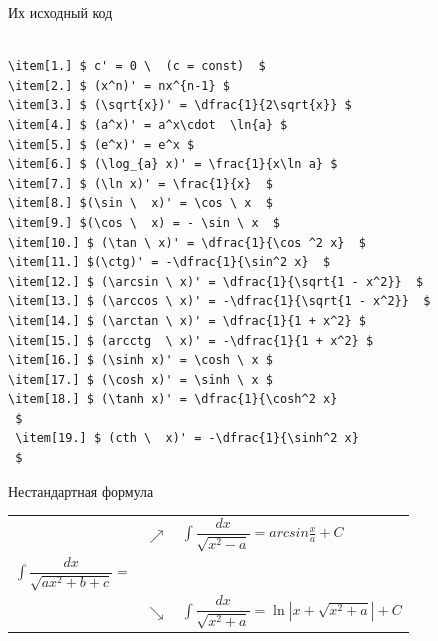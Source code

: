 \documentclass{beamer}[aspectratio=169]
\begin{document}
\begin{frame}[fragile]{Их исходный код}
\transwipe
\begin{adjustbox}{width=15cm,height=3.5cm,keepaspectratio}
 \begin{lstlisting}[language=Tex]

\item[1.] $ c' = 0 \  (c = const)  $
\item[2.] $ (x^n)' = nx^{n-1} $
\item[3.] $ (\sqrt{x})' = \dfrac{1}{2\sqrt{x}} $
\item[4.] $ (a^x)' = a^x\cdot  \ln{a} $
\item[5.] $ (e^x)' = e^x $
\item[6.] $ (\log_{a} x)' = \frac{1}{x\ln a} $
\item[7.] $ (\ln x)' = \frac{1}{x}  $ 
\item[8.] $(\sin \  x)' = \cos \ x  $ 
\item[9.] $(\cos \  x) = - \sin \ x  $ 
\item[10.] $ (\tan \ x)' = \dfrac{1}{\cos ^2 x}  $
\item[11.] $(\ctg)' = -\dfrac{1}{\sin^2 x}  $
\item[12.] $ (\arcsin \ x)' = \dfrac{1}{\sqrt{1 - x^2}}  $ 
\item[13.] $ (\arccos \ x)' = -\dfrac{1}{\sqrt{1 - x^2}}  $ 
\item[14.] $ (\arctan \ x)' = \dfrac{1}{1 + x^2} $
\item[15.] $ (arcctg  \ x)' = -\dfrac{1}{1 + x^2} $
\item[16.] $ (\sinh x)' = \cosh \ x $
\item[17.] $ (\cosh x)' = \sinh \ x $
\item[18.] $ (\tanh x)' = \dfrac{1}{\cosh^2 x}
 $
 \item[19.] $ (cth \  x)' = -\dfrac{1}{\sinh^2 x}
 $
\end{lstlisting}
\end{adjustbox}
\end{frame}

\begin{frame}{Нестандартная формула}
\transwipe
\begin{tabular}{l l l} 
   &  {$\nearrow $} & {$ \int \dfrac{dx}{\sqrt{x^2-a}}=arcsin\frac{x}{a} + C $} \\
  $ \int \dfrac{dx}{\sqrt{ax^2 + b + c}} = $ &  &  \\ 
       & $\searrow $ & $ \int \dfrac{dx}{\sqrt{x^2+a}} = \ln|x+\sqrt{x^2+a}| + C  $\\ 
  \end{tabular}

\end{frame}
\end{document}
